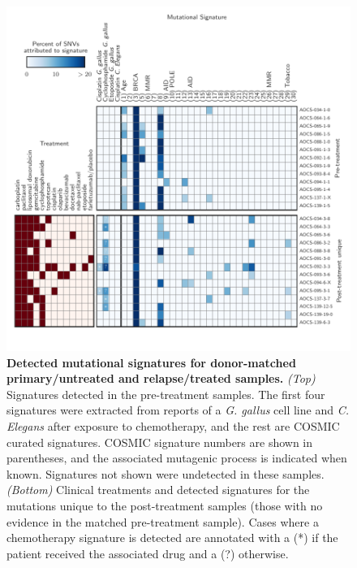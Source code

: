 \begin{figure}[htbp]
\centering
\includegraphics[scale=1.0]{figures/signatures.pdf}
\caption{\textbf{Detected mutational signatures for donor-matched primary/untreated and relapse/treated samples.} \textit{(Top)} Signatures detected in the pre-treatment samples. The first four signatures were extracted from reports of a \textit{G. gallus} cell line and \textit{C. Elegans} after exposure to chemotherapy, and the rest are COSMIC curated signatures. COSMIC signature numbers are shown in parentheses, and the associated mutagenic process is indicated when known. Signatures not shown were undetected in these samples. \textit{(Bottom)} Clinical treatments and detected signatures for the mutations unique to the post-treatment samples (those with no evidence in the matched pre-treatment sample). Cases where a chemotherapy signature is detected are annotated with a (*) if the patient received the associated drug and a (?) otherwise.}
\label{fig:signatures}
\end{figure}


